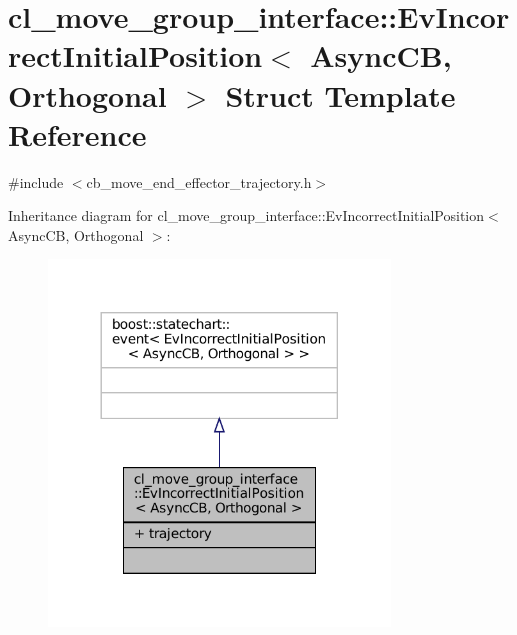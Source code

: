 \hypertarget{structcl__move__group__interface_1_1EvIncorrectInitialPosition}{}\section{cl\+\_\+move\+\_\+group\+\_\+interface\+:\+:Ev\+Incorrect\+Initial\+Position$<$ Async\+CB, Orthogonal $>$ Struct Template Reference}
\label{structcl__move__group__interface_1_1EvIncorrectInitialPosition}


{\ttfamily \#include $<$cb\+\_\+move\+\_\+end\+\_\+effector\+\_\+trajectory.\+h$>$}



Inheritance diagram for cl\+\_\+move\+\_\+group\+\_\+interface\+:\+:Ev\+Incorrect\+Initial\+Position$<$ Async\+CB, Orthogonal $>$\+:
\nopagebreak
\begin{figure}[H]
\begin{center}
\leavevmode
\includegraphics[width=257pt]{structcl__move__group__interface_1_1EvIncorrectInitialPosition__inherit__graph}
\end{center}
\end{figure}


